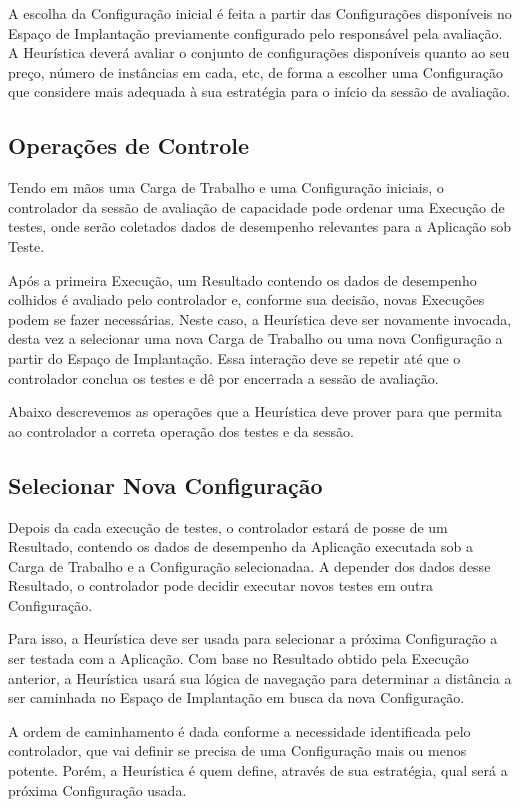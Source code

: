 A escolha da Configuração inicial é feita a partir das Configurações disponíveis
no Espaço de Implantação previamente configurado pelo responsável pela avaliação.
A Heurística deverá avaliar o conjunto de configurações disponíveis quanto ao seu
preço, número de instâncias em cada, etc, de forma a escolher uma Configuração 
que considere mais adequada à sua estratégia para o início da sessão de avaliação.

\subsection{Operações de Controle}
Tendo em mãos uma Carga de Trabalho e uma Configuração iniciais, o controlador
da sessão de avaliação de capacidade pode ordenar uma Execução de testes, onde
serão coletados dados de desempenho relevantes para a Aplicação sob Teste.

Após a primeira Execução, um Resultado contendo os dados de desempenho colhidos 
é avaliado pelo controlador e, conforme sua decisão, novas Execuções podem se 
fazer necessárias. Neste caso, a Heurística deve ser novamente invocada, desta 
vez a selecionar uma nova Carga de Trabalho ou uma nova Configuração a partir do
Espaço de Implantação. Essa interação deve se repetir até que o controlador 
conclua os testes e dê por encerrada a sessão de avaliação.

Abaixo descrevemos as operações que a Heurística deve prover para que permita ao
controlador a correta operação dos testes e da sessão.

\subsection{Selecionar Nova Configuração}
Depois da cada execução de testes, o controlador estará de posse de um Resultado,
contendo os dados de desempenho da Aplicação executada sob a Carga de Trabalho e
a Configuração selecionadaa. A depender dos dados desse Resultado, o controlador
pode decidir executar novos testes em outra Configuração.

Para isso, a Heurística deve ser usada para selecionar a próxima Configuração a 
ser testada com a Aplicação. Com base no Resultado obtido pela Execução anterior,
a Heurística usará sua lógica de navegação para determinar a distância a ser 
caminhada no Espaço de Implantação em busca da nova Configuração.

A ordem de caminhamento é dada conforme a necessidade identificada pelo 
controlador, que vai definir se precisa de uma Configuração mais ou menos potente.
Porém, a Heurística é quem define, através de sua estratégia, qual será a próxima
Configuração usada.

